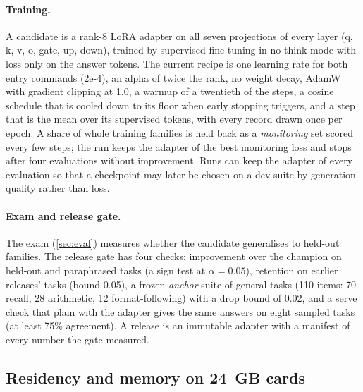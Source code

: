 \paragraph{Training.}
A candidate is a rank-8 LoRA adapter on all seven projections of every layer
(q, k, v, o, gate, up, down), trained by supervised fine-tuning in no-think mode
with loss only on the answer tokens. The current recipe is one learning rate for both
entry commands (2e-4), an alpha of twice the rank, no weight decay, AdamW with gradient
clipping at 1.0, a warmup of a twentieth of the steps, a cosine schedule that is cooled
down to its floor when early stopping triggers, and a step that is the mean over its
supervised tokens, with every record drawn once per epoch. A share of whole training
families is held back as a \emph{monitoring} set scored every few steps; the run keeps the
adapter of the best monitoring loss and stops after four evaluations without improvement.
Runs can keep the adapter of every evaluation so that a checkpoint may later be chosen on a
dev suite by generation quality rather than loss.

\paragraph{Exam and release gate.}
The exam (\cref{sec:eval}) measures whether the candidate generalises to held-out families.
The release gate has four checks: improvement over the champion on held-out and paraphrased
tasks (a sign test at $\alpha=0.05$), retention on earlier releases' tasks (bound 0.05),
a frozen \emph{anchor} suite of general tasks (110 items: 70 recall, 28 arithmetic, 12
format-following) with a drop bound of 0.02, and a serve check that plain 
with the adapter gives the same answers on eight sampled tasks (at least 75\% agreement).
A release is an immutable adapter with a manifest of every number the gate measured.

\subsection{Residency and memory on 24~GB cards}\label{sec:residency}

